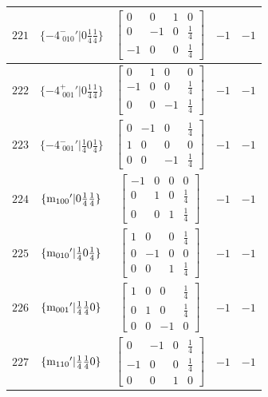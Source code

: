 \documentclass[fleqn,8pt]{jsarticle}
\begin{document}
\begin{longtable}{ccccc}
$ 221 $ & $ \{-4^{-}_{\,\,010}{}'|0 \frac{1}{4} \frac{1}{4}\} $ & $ \begin{bmatrix} 0 & 0 & 1 & 0 \\ 0 & -1 & 0 & \frac{1}{4} \\ -1 & 0 & 0 & \frac{1}{4} \end{bmatrix} $ & $ -1 $ & $ -1 $ \\ \hline
$ 222 $ & $ \{-4^{+}_{\,\,001}{}'|0 \frac{1}{4} \frac{1}{4}\} $ & $ \begin{bmatrix} 0 & 1 & 0 & 0 \\ -1 & 0 & 0 & \frac{1}{4} \\ 0 & 0 & -1 & \frac{1}{4} \end{bmatrix} $ & $ -1 $ & $ -1 $ \\ \hline
$ 223 $ & $ \{-4^{-}_{\,\,001}{}'|\frac{1}{4} 0 \frac{1}{4}\} $ & $ \begin{bmatrix} 0 & -1 & 0 & \frac{1}{4} \\ 1 & 0 & 0 & 0 \\ 0 & 0 & -1 & \frac{1}{4} \end{bmatrix} $ & $ -1 $ & $ -1 $ \\ \hline
$ 224 $ & $ \{{\rm m}_{100}{}'|0 \frac{1}{4} \frac{1}{4}\} $ & $ \begin{bmatrix} -1 & 0 & 0 & 0 \\ 0 & 1 & 0 & \frac{1}{4} \\ 0 & 0 & 1 & \frac{1}{4} \end{bmatrix} $ & $ -1 $ & $ -1 $ \\ \hline
$ 225 $ & $ \{{\rm m}_{010}{}'|\frac{1}{4} 0 \frac{1}{4}\} $ & $ \begin{bmatrix} 1 & 0 & 0 & \frac{1}{4} \\ 0 & -1 & 0 & 0 \\ 0 & 0 & 1 & \frac{1}{4} \end{bmatrix} $ & $ -1 $ & $ -1 $ \\ \hline
$ 226 $ & $ \{{\rm m}_{001}{}'|\frac{1}{4} \frac{1}{4} 0\} $ & $ \begin{bmatrix} 1 & 0 & 0 & \frac{1}{4} \\ 0 & 1 & 0 & \frac{1}{4} \\ 0 & 0 & -1 & 0 \end{bmatrix} $ & $ -1 $ & $ -1 $ \\ \hline
$ 227 $ & $ \{{\rm m}_{110}{}'|\frac{1}{4} \frac{1}{4} 0\} $ & $ \begin{bmatrix} 0 & -1 & 0 & \frac{1}{4} \\ -1 & 0 & 0 & \frac{1}{4} \\ 0 & 0 & 1 & 0 \end{bmatrix} $ & $ -1 $ & $ -1 $ \\ \hline

\end{longtable}
\end{document}
